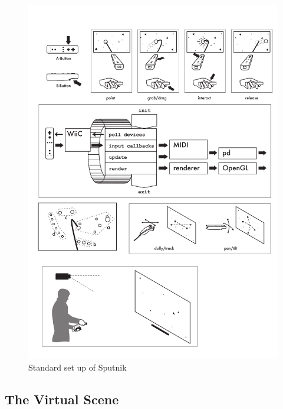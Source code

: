 \documentclass[10pt,a4paper]{scrartcl}
\begin{document}
\begin{figure}[hbtp]
\begin{center}
\includegraphics[width=0.7\columnwidth]{img/setup}
\caption{Standard set up of Sputnik}
\label{fig:sputnik-setup}
\end{center}
\end{figure}




\subsection{The Virtual Scene}
\label{sec:virtual-scene}
\end{document}
